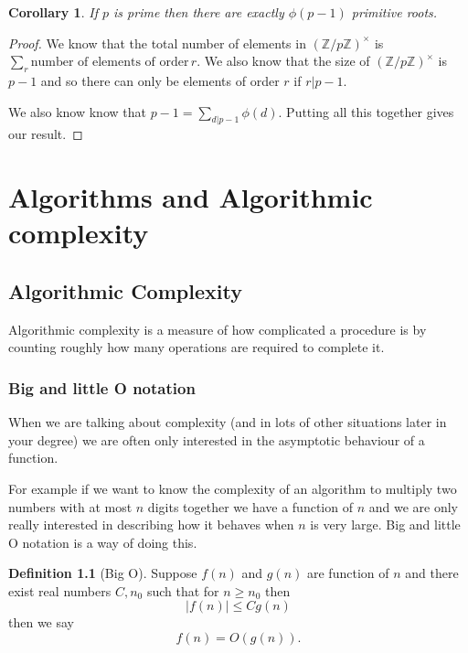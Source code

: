 \documentclass[
]{book}
\newtheorem{corollary}{Corollary}[chapter]
\theoremstyle{definition}
\newtheorem{definition}{Definition}[chapter]
\theoremstyle{definition}
\theoremstyle{definition}
\theoremstyle{definition}
\theoremstyle{remark}
\begin{document}
\begin{corollary}
If \(p\) is prime then there are exactly \(\phi(p-1)\) primitive roots.
\end{corollary}

\begin{proof}
We know that the total number of elements in \(\left(\mathbb{Z}/p\mathbb{Z} \right)^{\times}\) is \(\sum_{r} \mbox{number of elements of order}\, r\). We also know that the size of \(\left(\mathbb{Z}/p\mathbb{Z} \right)^{\times}\) is \(p-1\) and so there can only be elements of order \(r\) if \(r|p-1\).

We also know know that \(p-1 = \sum_{d|p-1} \phi(d)\). Putting all this together gives our result.
\end{proof}

\chapter{Algorithms and Algorithmic complexity}\label{algorithms-and-algorithmic-complexity}

\section{Algorithmic Complexity}\label{algorithmic-complexity}

Algorithmic complexity is a measure of how complicated a procedure is by counting roughly how many operations are required to complete it.

\subsection{Big and little O notation}\label{big-and-little-o-notation}

When we are talking about complexity (and in lots of other situations later in your degree) we are often only interested in the asymptotic behaviour of a function.

For example if we want to know the complexity of an algorithm to multiply two numbers with at most \(n\) digits together we have a function of \(n\) and we are only really interested in describing how it behaves when \(n\) is very large. Big and little O notation is a way of doing this.

\begin{definition}[Big O]
Suppose \(f(n)\) and \(g(n)\) are function of \(n\) and there exist real numbers \(C, n_0\) such that for \(n \geq n_0\) then
\[|f(n)| \leq C g(n)\] then we say
\[ f(n) = O(g(n)).  \]
\end{definition}
\end{document}
